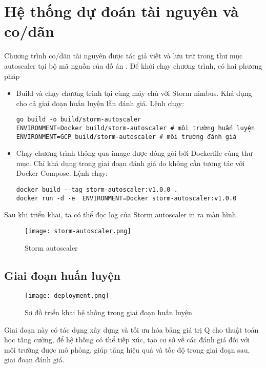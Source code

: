 \section{Hệ thống dự đoán tài nguyên và co/dãn}

Chương trình co/dãn tài nguyên được tác giả viết và lưu trữ trong thư mục autoscaler tại bộ mã nguồn của đồ án \autocite{lemionday_thesis_storm}. Để khởi chạy chương trình, có hai phương pháp

\begin{itemize}
    \item Build và chạy chương trình tại cùng máy chủ với Storm nimbus. Khả dụng cho cả giai đoạn huấn luyện lẫn đánh giá. Lệnh chạy:
          \begin{verbatim}
go build -o build/storm-autoscaler
ENVIRONMENT=Docker build/storm-autoscaler # môi trường huấn luyện
ENVIRONMENT=GCP build/storm-autoscaler # môi trường đánh giá
    \end{verbatim}
    \item Chạy chương trình thông qua image được đóng gói bởi Dockerfile cùng thư mục. Chỉ khả dụng trong giai đoạn đánh giá do không cần tương tác với Docker Compose. Lệnh chạy:
          \begin{verbatim}
docker build --tag storm-autoscaler:v1.0.0 .
docker run -d -e  ENVIRONMENT=Docker storm-autoscaler:v1.0.0
    \end{verbatim}
\end{itemize}

Sau khi triển khai, ta có thể đọc log của Storm autoscaler in ra màn hình.

\begin{figure}[H]
    \centering
    \texttt{[image: storm-autoscaler.png]}
    \caption{Storm autoscaler}
\end{figure}

\subsection{Giai đoạn huấn luyện}

\begin{figure}[htbp]
    \texttt{[image: deployment.png]}
    \caption{Sơ đồ triển khai hệ thống trong giai đoạn huấn luyện}
\end{figure}

Giai đoạn này có tác dụng xây dựng và tối ưu hóa bảng giá trị Q cho thuật toán học tăng cường, để hệ thống có thể tiếp xúc, tạo cơ sở về các đánh giá đối với môi trường được mô phỏng, giúp tăng hiệu quả và tốc độ trong giai đoạn sau, giai đoạn đánh giá.

